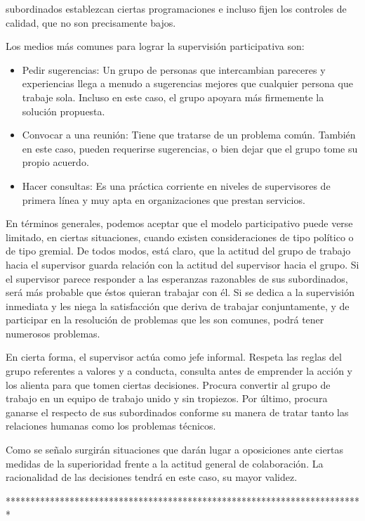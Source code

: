 
subordinados establezcan ciertas programaciones e incluso fijen los controles de calidad, que no son precisamente bajos.

Los medios más comunes para lograr la supervisión participativa son:

\begin{itemize}
  \item Pedir sugerencias: Un grupo de personas que intercambian pareceres y experiencias llega a menudo a sugerencias mejores que cualquier persona que trabaje sola. Incluso en este caso, el grupo apoyara más firmemente la solución propuesta.
  \item Convocar a una reunión: Tiene que tratarse de un problema común. También en este caso, pueden requerirse sugerencias, o bien dejar que el grupo tome su propio acuerdo.
  \item Hacer consultas: Es una práctica corriente en niveles de supervisores de primera línea y muy apta en organizaciones que prestan servicios.
\end{itemize}
En términos generales, podemos aceptar que el modelo participativo puede verse limitado, en ciertas situaciones, cuando existen consideraciones de tipo político o de tipo gremial. De todos modos, está claro, que la actitud del grupo de trabajo hacia el supervisor guarda relación con la actitud del supervisor hacia el grupo. Si el supervisor parece responder a las esperanzas razonables de sus subordinados, será más probable que éstos quieran trabajar con él. Si se dedica a la supervisión inmediata y les niega la satisfacción que deriva de trabajar conjuntamente, y de participar en la resolución de problemas que les son comunes, podrá tener numerosos problemas.

En cierta forma, el supervisor actúa como jefe informal. Respeta las reglas del grupo referentes a valores y a conducta, consulta antes de emprender la acción y los alienta para que tomen ciertas decisiones. Procura convertir al grupo de trabajo en un equipo de trabajo unido y sin tropiezos. Por último, procura ganarse el respecto de sus subordinados conforme su manera de tratar tanto las relaciones humanas como los problemas técnicos.

Como se señalo surgirán situaciones que darán lugar a oposiciones ante ciertas medidas de la superioridad frente a la actitud general de colaboración. La racionalidad de las decisiones tendrá en este caso, su mayor validez.

*************************************************************************


